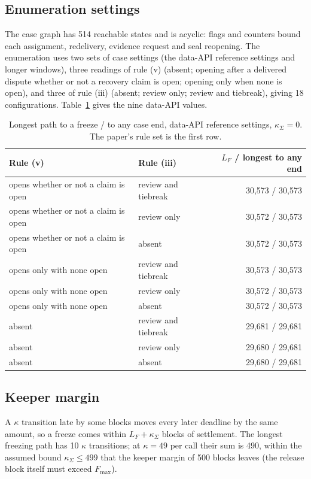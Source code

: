 \documentclass[10pt,a4paper]{article}
\newcommand{\Fmax}{F_{\max}}
\newcommand{\kS}{\kappa_{\Sigma}}
\theoremstyle{plain}
\theoremstyle{remark}
\begin{document}
\subsection{Enumeration settings}

The case graph has 514 reachable states and is acyclic: flags and counters bound each assignment, redelivery, evidence request and seal reopening. The enumeration uses two sets of case settings (the data-API reference settings and longer windows), three readings of rule (v) (absent; opening after a delivered dispute whether or not a recovery claim is open; opening only when none is open), and three of rule (iii) (absent; review only; review and tiebreak), giving 18 configurations. Table~\ref{tab:configs} gives the nine data-API values.

\begin{table}[!htbp]
\centering
\caption{Longest path to a freeze / to any case end, data-API reference settings, $\kS=0$. The paper's rule set is the first row.}
\label{tab:configs}
\footnotesize
\begin{tabular}{@{}llr@{}}
\toprule
Rule (v) & Rule (iii) & $L_F$ / longest to any end \\
\midrule
opens whether or not a claim is open & review and tiebreak & 30,573 / 30,573 \\
opens whether or not a claim is open & review only & 30,572 / 30,573 \\
opens whether or not a claim is open & absent & 30,572 / 30,573 \\
opens only with none open & review and tiebreak & 30,573 / 30,573 \\
opens only with none open & review only & 30,572 / 30,573 \\
opens only with none open & absent & 30,572 / 30,573 \\
absent & review and tiebreak & 29,681 / 29,681 \\
absent & review only & 29,680 / 29,681 \\
absent & absent & 29,680 / 29,681 \\
\bottomrule
\end{tabular}
\end{table}

\subsection{Keeper margin}

A $\kappa$ transition late by some blocks moves every later deadline by the same amount, so a freeze comes within $L_F+\kS$ blocks of settlement. The longest freezing path has 10 $\kappa$ transitions; at $\kappa=49$ per call their sum is 490, within the assumed bound $\kS\le499$ that the keeper margin of 500 blocks leaves (the release block itself must exceed $\Fmax$).
\end{document}
